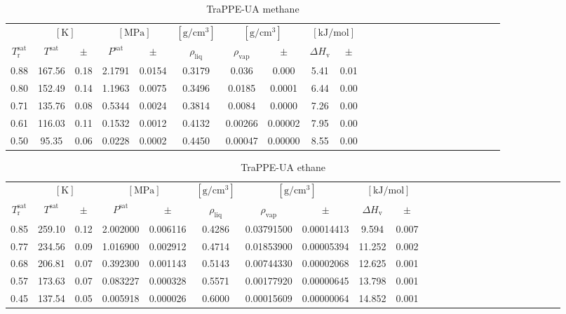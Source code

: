 \documentclass[%
 aip,
 jcp,
 sd,%
 amsmath,amssymb,
]{revtex4-1}
\begin{document}
\begin{table*}[!htbp]
\centering
\caption{
TraPPE-UA methane
}
\label{tab:TraPPE-C1-nistsim}
\begin{ruledtabular}
\begin{tabular}{cccccccccccccccccccccccc}
 & \multicolumn{2}{c}{$[\mathrm{K}]$} &	 \multicolumn{2}{c}{$[\mathrm{MPa}]$} & $[\mathrm{g/cm^3}]$ & \multicolumn{2}{c}{$[\mathrm{g/cm^3}]$} & \multicolumn{2}{c}{$[\mathrm{kJ/mol}]$} \\
$T_\mathrm{r}^{\mathrm{sat}}$ & $T^{\mathrm{sat}}$ & $\pm$ & $P^{\mathrm{sat}}$ & $\pm$ & $\rho_{\mathrm{liq}}$ & $\rho_{\mathrm{vap}}$ & $\pm$ & $\Delta H_{\mathrm{v}}$ & $\pm$
 \\
\hline		
0.88	&	167.56	&	0.18	&	2.1791	&	0.0154	&	0.3179	&	0.036	&	0.000	&	5.41	&	0.01	\\
0.80	&	152.49	&	0.14	&	1.1963	&	0.0075	&	0.3496	&	0.0185	&	0.0001	&	6.44	&	0.00	\\
0.71	&	135.76	&	0.08	&	0.5344	&	0.0024	&	0.3814	&	0.0084	&	0.0000	&	7.26	&	0.00	\\
0.61	&	116.03	&	0.11	&	0.1532	&	0.0012	&	0.4132	&	0.00266	&	0.00002	&	7.95	&	0.00	\\
0.50	&	95.35	&	0.06	&	0.0228	&	0.0002	&	0.4450	&	0.00047	&	0.00000	&	8.55	&	0.00	\\
\end{tabular}
\end{ruledtabular}
\end{table*}


\begin{table*}[]
\centering
\caption{
TraPPE-UA ethane
}
\label{tab:TraPPE-C2-trappe}
\begin{ruledtabular}
\begin{tabular}{cccccccccccccccccccccccc}
 & \multicolumn{2}{c}{$[\mathrm{K}]$} &	 \multicolumn{2}{c}{$[\mathrm{MPa}]$} & $[\mathrm{g/cm^3}]$ & \multicolumn{2}{c}{$[\mathrm{g/cm^3}]$} & \multicolumn{2}{c}{$[\mathrm{kJ/mol}]$} \\
$T_\mathrm{r}^{\mathrm{sat}}$ & $T^{\mathrm{sat}}$ & $\pm$ & $P^{\mathrm{sat}}$ & $\pm$ & $\rho_{\mathrm{liq}}$ & $\rho_{\mathrm{vap}}$ & $\pm$ & $\Delta H_{\mathrm{v}}$ & $\pm$
 \\
\hline		
0.85	&	259.10	&	0.12	&	2.002000	&	0.006116	&	0.4286	&	0.03791500	&	0.00014413	&	9.594	&	0.007	\\
0.77	&	234.56	&	0.09	&	1.016900	&	0.002912	&	0.4714	&	0.01853900	&	0.00005394	&	11.252	&	0.002	\\
0.68	&	206.81	&	0.07	&	0.392300	&	0.001143	&	0.5143	&	0.00744330	&	0.00002068	&	12.625	&	0.001	\\
0.57	&	173.63	&	0.07	&	0.083227	&	0.000328	&	0.5571	&	0.00177920	&	0.00000645	&	13.798	&	0.001	\\
0.45	&	137.54	&	0.05	&	0.005918	&	0.000026	&	0.6000	&	0.00015609	&	0.00000064	&	14.852	&	0.001	\\
\end{tabular}
\end{ruledtabular}
\end{table*}
\end{document}

